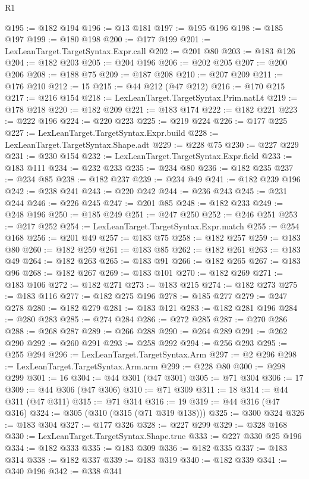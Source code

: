\begin{lexlean}{R1}
\begin{coremodule}
@195 := @182 @194
@196 := @13 @181
@197 := @195 @196
@198 := @185 @197
@199 := @180 @198
@200 := @177 @199
@201 := LexLeanTarget.TargetSyntax.Expr.call
@202 := @201 @80
@203 := @183 @126
@204 := @182 @203
@205 := @204 @196
@206 := @202 @205
@207 := @200 @206
@208 := @188 @75
@209 := @187 @208
@210 := @207 @209
@211 := @176 @210
@212 := 15
@215 := @44 @212 (@47 @212)
@216 := @170 @215
@217 := @216 @154
@218 := LexLeanTarget.TargetSyntax.Prim.natLt
@219 := @178 @218
@220 := @182 @209
@221 := @183 @174
@222 := @182 @221
@223 := @222 @196
@224 := @220 @223
@225 := @219 @224
@226 := @177 @225
@227 := LexLeanTarget.TargetSyntax.Expr.build
@228 := LexLeanTarget.TargetSyntax.Shape.adt
@229 := @228 @75
@230 := @227 @229
@231 := @230 @154
@232 := LexLeanTarget.TargetSyntax.Expr.field
@233 := @183 @111
@234 := @232 @233
@235 := @234 @80
@236 := @182 @235
@237 := @234 @85
@238 := @182 @237
@239 := @234 @49
@241 := @182 @239 @196
@242 := @238 @241
@243 := @220 @242
@244 := @236 @243
@245 := @231 @244
@246 := @226 @245
@247 := @201 @85
@248 := @182 @233
@249 := @248 @196
@250 := @185 @249
@251 := @247 @250
@252 := @246 @251
@253 := @217 @252
@254 := LexLeanTarget.TargetSyntax.Expr.match
@255 := @254 @168
@256 := @201 @49
@257 := @183 @75
@258 := @182 @257
@259 := @183 @80
@260 := @182 @259
@261 := @183 @85
@262 := @182 @261
@263 := @183 @49
@264 := @182 @263
@265 := @183 @91
@266 := @182 @265
@267 := @183 @96
@268 := @182 @267
@269 := @183 @101
@270 := @182 @269
@271 := @183 @106
@272 := @182 @271
@273 := @183 @215
@274 := @182 @273
@275 := @183 @116
@277 := @182 @275 @196
@278 := @185 @277
@279 := @247 @278
@280 := @182 @279
@281 := @183 @121
@283 := @182 @281 @196
@284 := @280 @283
@285 := @274 @284
@286 := @272 @285
@287 := @270 @286
@288 := @268 @287
@289 := @266 @288
@290 := @264 @289
@291 := @262 @290
@292 := @260 @291
@293 := @258 @292
@294 := @256 @293
@295 := @255 @294
@296 := LexLeanTarget.TargetSyntax.Arm
@297 := @2 @296
@298 := LexLeanTarget.TargetSyntax.Arm.arm
@299 := @228 @80
@300 := @298 @299
@301 := 16
@304 := @44 @301 (@47 @301)
@305 := @71 @304
@306 := 17
@309 := @44 @306 (@47 @306)
@310 := @71 @309
@311 := 18
@314 := @44 @311 (@47 @311)
@315 := @71 @314
@316 := 19
@319 := @44 @316 (@47 @316)
@324 := @305 (@310 (@315 (@71 @319 @138)))
@325 := @300 @324
@326 := @183 @304
@327 := @177 @326
@328 := @227 @299
@329 := @328 @168
@330 := LexLeanTarget.TargetSyntax.Shape.true
@333 := @227 @330 @25 @196
@334 := @182 @333
@335 := @183 @309
@336 := @182 @335
@337 := @183 @314
@338 := @182 @337
@339 := @183 @319
@340 := @182 @339
@341 := @340 @196
@342 := @338 @341

\end{coremodule}
\end{lexlean}
